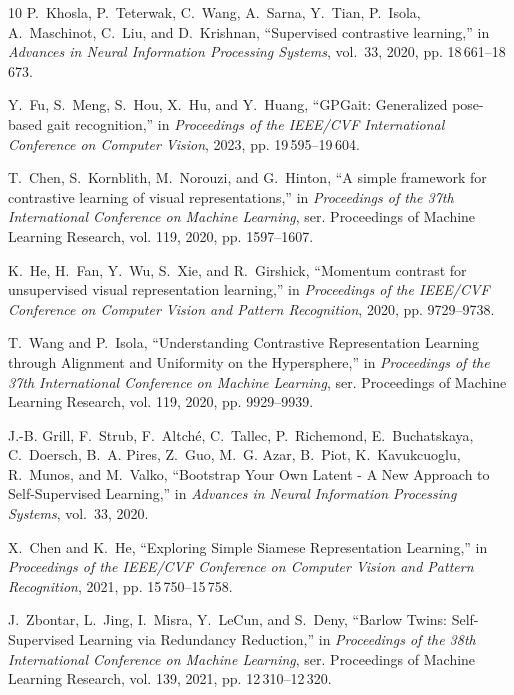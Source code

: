 \documentclass[journal]{IEEEtran}
\begin{document}
\begin{thebibliography}{10}
P.~Khosla, P.~Teterwak, C.~Wang, A.~Sarna, Y.~Tian, P.~Isola, A.~Maschinot,
  C.~Liu, and D.~Krishnan, ``Supervised contrastive learning,'' in
  \emph{{Advances in Neural Information Processing Systems}}, vol.~33, 2020,
  pp. 18\,661--18\,673.

Y.~Fu, S.~Meng, S.~Hou, X.~Hu, and Y.~Huang, ``{GPGait}: Generalized pose-based
  gait recognition,'' in \emph{{Proceedings of the IEEE/CVF International
  Conference on Computer Vision}}, 2023, pp. 19\,595--19\,604.

T.~Chen, S.~Kornblith, M.~Norouzi, and G.~Hinton, ``A simple framework for
  contrastive learning of visual representations,'' in \emph{{Proceedings of
  the 37th International Conference on Machine Learning}}, ser. Proceedings of
  Machine Learning Research, vol. 119, 2020, pp. 1597--1607.

K.~He, H.~Fan, Y.~Wu, S.~Xie, and R.~Girshick, ``Momentum contrast for
  unsupervised visual representation learning,'' in \emph{{Proceedings of the
  IEEE/CVF Conference on Computer Vision and Pattern Recognition}}, 2020, pp.
  9729--9738.

T.~Wang and P.~Isola, ``{Understanding Contrastive Representation Learning
  through Alignment and Uniformity on the Hypersphere},'' in \emph{{Proceedings
  of the 37th International Conference on Machine Learning}}, ser. Proceedings
  of Machine Learning Research, vol. 119, 2020, pp. 9929--9939.

J.-B. Grill, F.~Strub, F.~Altch{\'e}, C.~Tallec, P.~Richemond, E.~Buchatskaya,
  C.~Doersch, B.~A. Pires, Z.~Guo, M.~G. Azar, B.~Piot, K.~Kavukcuoglu,
  R.~Munos, and M.~Valko, ``{Bootstrap Your Own Latent - A New Approach to
  Self-Supervised Learning},'' in \emph{{Advances in Neural Information
  Processing Systems}}, vol.~33, 2020.

X.~Chen and K.~He, ``{Exploring Simple Siamese Representation Learning},'' in
  \emph{{Proceedings of the IEEE/CVF Conference on Computer Vision and Pattern
  Recognition}}, 2021, pp. 15\,750--15\,758.

J.~Zbontar, L.~Jing, I.~Misra, Y.~LeCun, and S.~Deny, ``{Barlow Twins:
  Self-Supervised Learning via Redundancy Reduction},'' in \emph{{Proceedings
  of the 38th International Conference on Machine Learning}}, ser. Proceedings
  of Machine Learning Research, vol. 139, 2021, pp. 12\,310--12\,320.


\end{thebibliography}
\end{document}
